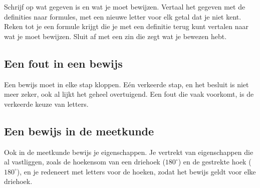 \begin{werkwijze}
Schrijf op wat gegeven is en wat je moet bewijzen. Vertaal het gegeven met de definities naar formules, met een nieuwe letter voor elk getal dat je niet kent. Reken tot je een formule krijgt die je met een definitie terug kunt vertalen naar wat je moet bewijzen. Sluit af met een zin die zegt wat je bewezen hebt.
\end{werkwijze}

\begin{oefeningen}
\end{oefeningen}

\subsection{Een fout in een bewijs}

Een bewijs moet in elke stap kloppen. Eén verkeerde stap, en het besluit is niet meer zeker, ook al lijkt het geheel overtuigend. Een fout die vaak voorkomt, is de verkeerde keuze van letters.


\begin{oefeningen}
\end{oefeningen}

\subsection{Een bewijs in de meetkunde}

Ook in de meetkunde bewijs je eigenschappen. Je vertrekt van eigenschappen die al vastliggen, zoals de hoekensom van een driehoek ($180^\circ$) en de gestrekte hoek ($180^\circ$), en je redeneert met letters voor de hoeken, zodat het bewijs geldt voor elke driehoek.

